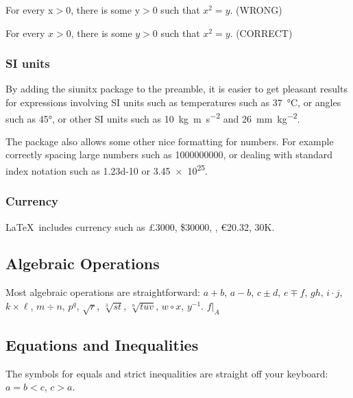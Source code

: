 \documentclass[a4paper,11pt]{article}
\begin{document}
For every  x$>$0, there is some y$>$0 such that $x^2=y$. (WRONG)

For every $x>0$, there is some $y>0$ such that $x^2=y$. (CORRECT)


\subsubsection{SI units}

By adding the siunitx package to the preamble, it is easier to get pleasant results for expressions involving SI units such as temperatures such as \SI{37}{\degreeCelsius}, or angles such as \ang{45}, or other SI units such as \SI{10}{kg.m.s^{-2}} and \SI{26}{\milli\metre\per\kilogram\squared}.

The package also allows some other nice formatting for numbers. For example correctly spacing large numbers such as \num{1000000000}, or dealing with standard index notation such as \num{1.23d-10} or \num{3.45e25}.


\subsubsection{Currency}

\LaTeX \, includes currency such as 
\pounds 3000, 
\$30000, 
, 
\euro 20.32, %
\textwon 30K.


\subsection{Algebraic Operations}

Most algebraic operations are straightforward: 
$a+b$, $a-b$, 
$c\pm d$, 		%
$e\mp f$, 		%
$gh$,
$i\cdot j$, 		%
$k\times \ell$, 	%
$m \div n$, 	%
$p^q$,  		%
$\sqrt{r}$, 	%
$\sqrt[3]{st}$, $\sqrt[n]{tuv}$,  %
$w \circ x$,	%
$y^{-1} $.		%
$f\big|_A$		%


\subsection{Equations and Inequalities}

The symbols for equals and strict inequalities are straight off your keyboard: $a=b<c$, $c>a$.
\end{document}
